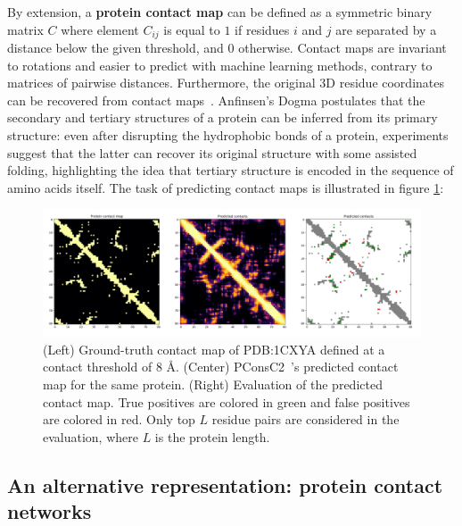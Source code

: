         By extension, a \textbf{protein contact map} can be defined as a symmetric binary matrix $C$ where element $C_{ij}$ 
        is equal to $1$ if residues $i$ and $j$
        are separated by a distance below the given threshold, and $0$ otherwise. Contact maps are invariant to rotations and easier to predict
        with machine learning methods, contrary to matrices of pairwise distances. Furthermore, the original 3D residue coordinates can be recovered from
        contact maps~\cite{10.1007/978-3-540-72031-7_53}. Anfinsen's Dogma postulates that the secondary and tertiary structures
        of a protein can be inferred from its primary structure: even after disrupting the hydrophobic bonds of a protein, experiments suggest
        that the latter can recover its original structure with some assisted folding,
        highlighting the idea that tertiary structure is encoded in the sequence of amino acids itself.
        The task of predicting contact maps is illustrated in figure \ref{cmaps}:

        \begin{figure}[H]
            \begin{center}
                \includegraphics[width=\textwidth, keepaspectratio]{imgs/1CXYA.png}
                \caption{(Left) Ground-truth contact map of PDB:1CXYA defined at a contact threshold of 8 \AA{}.
                    (Center) PConsC2~\cite{10.1371/journal.pcbi.1003889}'s
                    predicted contact map for the same protein. (Right) Evaluation of the predicted contact map.
                    True positives are colored in green and false positives are colored in red. Only top $L$ residue pairs
                    are considered in the evaluation, where $L$ is the protein length.}
                \label{cmaps}
            \end{center}
        \end{figure}


    \subsection{An alternative representation: protein contact networks} \label{pcn}

